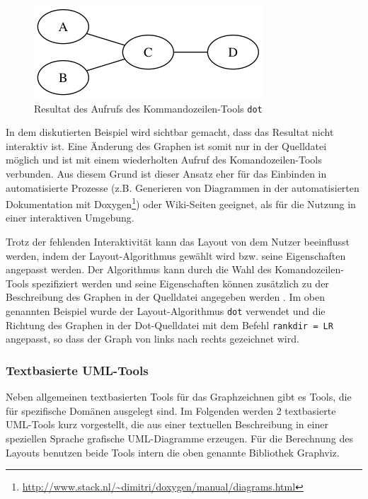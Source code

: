 

\begin{figure}[hbt]
    \centering
    \includegraphics[scale=0.75]{resources/graphviz-dot-example.png}
    \caption{Resultat des Aufrufs des Kommandozeilen-Tools \lstinline{dot}}
    \label{fig:graphviz-dot-example}
\end{figure}

In dem diskutierten Beispiel wird sichtbar gemacht, dass das Resultat nicht interaktiv ist. Eine Änderung des Graphen ist somit nur in der Quelldatei möglich und ist mit einem wiederholten Aufruf des Komandozeilen-Tools verbunden. Aus diesem Grund ist dieser Ansatz eher für das Einbinden in automatisierte Prozesse (z.B. Generieren von Diagrammen in der automatisierten Dokumentation mit Doxygen\footnote{\url{http://www.stack.nl/~dimitri/doxygen/manual/diagrams.html}}) oder Wiki-Seiten geeignet, als für die Nutzung in einer interaktiven Umgebung.

Trotz der fehlenden Interaktivität kann das Layout von dem Nutzer beeinflusst werden, indem der Layout-Algorithmus gewählt wird bzw. seine Eigenschaften angepasst werden. Der Algorithmus kann durch die Wahl des Komandozeilen-Tools spezifiziert werden und seine Eigenschaften können zusätzlich zu der Beschreibung des Graphen in der Quelldatei angegeben werden \cite{NorthGansner14Dot-Manual}. Im oben genannten Beispiel wurde der Layout-Algorithmus \lstinline{dot} verwendet und die Richtung des Graphen in der Dot-Quelldatei mit dem Befehl \lstinline{rankdir = LR} angepasst, so dass der Graph von links nach rechts gezeichnet wird.

\subsubsection{Textbasierte UML-Tools}

Neben allgemeinen textbasierten Tools für das Graphzeichnen gibt es Tools, die für spezifische Domänen ausgelegt sind. Im Folgenden werden 2 textbasierte UML-Tools kurz vorgestellt, die aus einer textuellen Beschreibung in einer speziellen Sprache grafische UML-Diagramme erzeugen. Für die Berechnung des Layouts benutzen beide Tools intern die oben genannte Bibliothek Graphviz.

